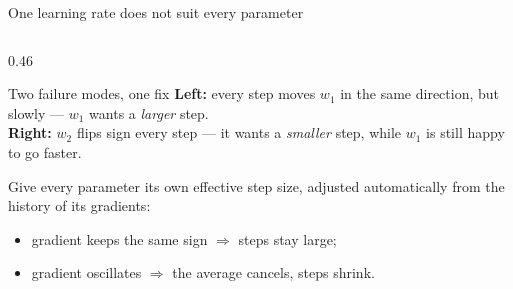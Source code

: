 \documentclass[aspectratio=169,10pt]{beamer}
\begin{document}
\begin{frame}{One learning rate does not suit every parameter}
\begin{columns}[T,onlytextwidth]
\begin{column}{0.46\textwidth}
\begin{block}{Two failure modes, one fix}
        \textbf{Left:} every step moves $w_1$ in the same direction, but slowly --- $w_1$
        wants a \emph{larger} step.\\[2pt]
        \textbf{Right:} $w_2$ flips sign every step --- it wants a \emph{smaller} step,
        while $w_1$ is still happy to go faster.
      \end{block}
      \begin{keyidea}
        Give every parameter its own effective step size, adjusted automatically from the
        history of its gradients:
        \begin{itemize}
          \item gradient keeps the same sign $\Rightarrow$ steps stay large;
          \item gradient oscillates $\Rightarrow$ the average cancels, steps shrink.
        \end{itemize}
      \end{keyidea}
    \end{column}
  \end{columns}
\end{frame}
\end{document}
